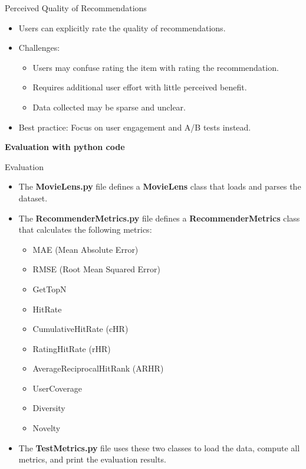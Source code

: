 \documentclass{beamer}
\begin{document}
\begin{frame}{Perceived Quality of Recommendations}
\begin{itemize}
    \item Users can explicitly rate the quality of recommendations.
    \item Challenges:
    \begin{itemize}
        \item Users may confuse rating the item with rating the recommendation.
        \item Requires additional user effort with little perceived benefit.
        \item Data collected may be sparse and unclear.
    \end{itemize}
    \item Best practice: Focus on user engagement and A/B tests instead.
\end{itemize}
\end{frame}

\begin{frame}[plain]
    \begin{center}
        {\LARGE \textbf{Evaluation with python code}}
    \end{center}
\end{frame}

\begin{frame}{Evaluation}
\begin{itemize}
    \item The \textbf{MovieLens.py} file defines a \textbf{MovieLens} class that loads and parses the dataset.
    
    \item The \textbf{RecommenderMetrics.py} file defines a \textbf{RecommenderMetrics} class that calculates the following metrics:
    \begin{itemize}
        \item MAE (Mean Absolute Error)
        \item RMSE (Root Mean Squared Error)
        \item GetTopN
        \item HitRate
        \item CumulativeHitRate (cHR)
        \item RatingHitRate (rHR)
        \item AverageReciprocalHitRank (ARHR)
        \item UserCoverage
        \item Diversity
        \item Novelty
    \end{itemize}

    \item The \textbf{TestMetrics.py} file uses these two classes to load the data, compute all metrics, and print the evaluation results.
\end{itemize}
\end{frame}
\end{document}
